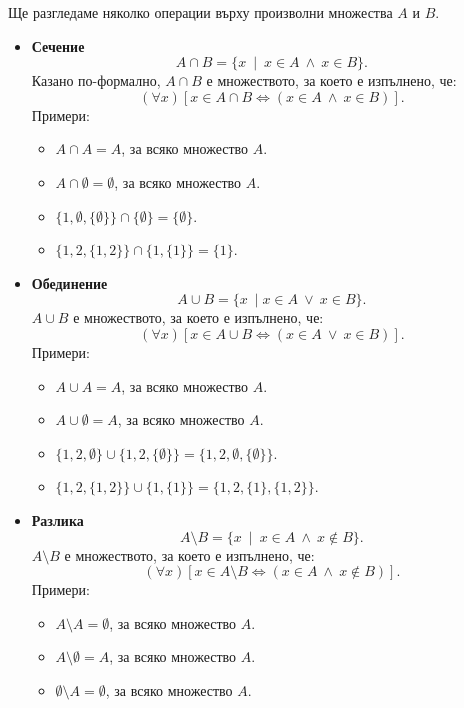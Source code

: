 Ще разгледаме няколко операции върху произволни множества $A$ и $B$.
\begin{itemize}
\item
  {\bf Сечение}
  \[A\cap B = \{x\ \mid\ x\in A\ \wedge\ x\in B\}.\]
  Казано по-формално, $A\cap B$ е множеството, за което е изпълнено, че:
  \[(\forall x)[x \in A\cap B \iff (x\in A\ \land\ x \in B)].\]
  Примери:
  \begin{itemize}
  \item
    $A \cap A = A$, за всяко множество $A$.
  \item
    $A \cap \emptyset = \emptyset$, за всяко множество $A$.
  \item
    $\{1,\emptyset,\{\emptyset\}\} \cap \{\emptyset\} = \{\emptyset\}$.
  \item
    $\{1,2,\{1,2\}\} \cap \{1,\{1\}\} = \{1\}$.
  \end{itemize}
\item
  {\bf Обединение}
  \[A\cup B = \{x\ \mid x\in A\ \vee\ x\in B\}.\]
  $A\cup B$ е множеството, за което е изпълнено, че:
  \[(\forall x)[x \in A\cup B \iff (x\in A\ \lor\ x \in B)].\]
  Примери:
  \begin{itemize}
  \item
    $A \cup A = A$, за всяко множество $A$.
  \item 
    $A \cup \emptyset = A$, за всяко множество $A$.
  \item
    $\{1,2,\emptyset\} \cup \{1,2,\{\emptyset\}\} = \{1,2,\emptyset,\{\emptyset\}\}$.
  \item
    $\{1,2,\{1,2\}\} \cup \{1,\{1\}\} = \{1,2,\{1\},\{1,2\}\}$.
  \end{itemize}
\item
  {\bf Разлика}
  \[A\setminus B = \{x\ \mid\ x\in A\ \wedge\ x\not\in B\}.\]
  $A\setminus B$ е множеството, за което е изпълнено, че:
  \[(\forall x)[x \in A\setminus B \iff (x\in A\ \wedge\ x \not\in B)].\]
  Примери:
  \begin{itemize}
  \item
    $A \setminus A = \emptyset$, за всяко множество $A$.
  \item 
    $A \setminus \emptyset = A$, за всяко множество $A$.
  \item 
    $\emptyset \setminus A = \emptyset$, за всяко множество $A$.

\end{itemize}
\end{itemize}
